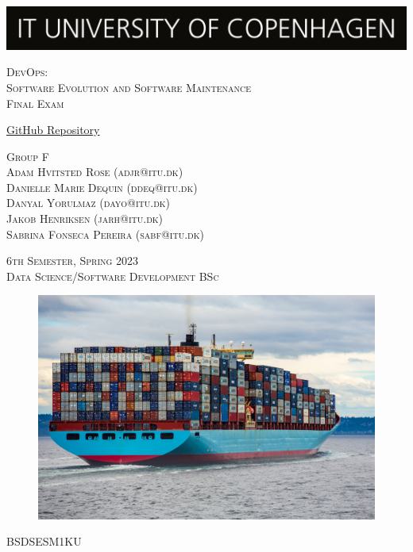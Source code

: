 \begin{titlepage}

\centering
~\vspace{0.5cm}

\includegraphics[width=\textwidth]{figures/logo.jpg}
\vspace{0.1cm}

{\LARGE\scshape DevOps: \\ Software Evolution and Software Maintenance \\
Final Exam\\}
\vspace{1cm}

{\large \href{https://github.com/ContainerMaintainers/MiniTwit-Golang}{GitHub Repository}}
\vspace{.5cm}

{\scshape Group F \\ Adam Hvitsted Rose (adjr@itu.dk) \\ Danielle Marie Dequin (ddeq@itu.dk) \\ Danyal Yorulmaz (dayo@itu.dk) \\ Jakob Henriksen (jarh@itu.dk) \\ Sabrina Fonseca Pereira (sabf@itu.dk)}
\vspace{1.5cm}

{\scshape 6th Semester, Spring 2023\\Data Science/Software Development BSc}
\vspace{.5cm}

\begin{figure}[h]
\begin{center}
    \includegraphics[scale=0.2]{figures/ship.jpg}
\end{center}
\end{figure}
BSDSESM1KU
\end{titlepage}